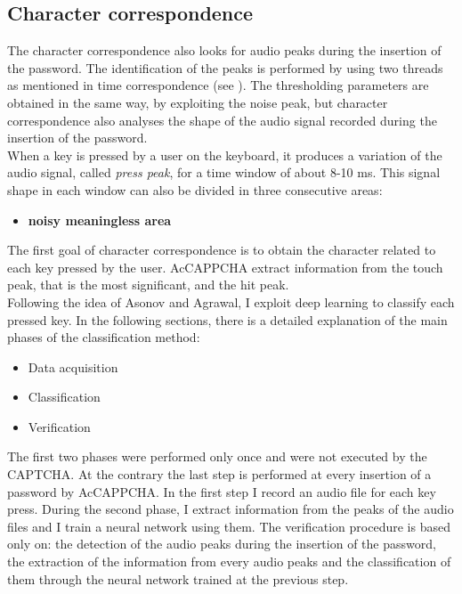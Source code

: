 \subsection{Character correspondence}\label{AcCAPPCHA:char_correspondence}
The character correspondence also looks for audio peaks during the insertion of the password. The identification of the peaks is performed by using two threads as mentioned in time correspondence (see ). The thresholding parameters are obtained in the same way, by exploiting the noise peak, but character correspondence also analyses the shape of the audio signal recorded during the insertion of the password.\\
When a key is pressed by a user on the keyboard, it produces a variation of the audio signal, called \textit{press peak}, for a time window of about 8-10 ms\cite{keyboard_acoustic}. This signal shape in each window can also be divided in three consecutive areas:
\begin{itemize}
\item{\textbf{noisy meaningless area}}
\end{itemize}
The first goal of character correspondence is to obtain the character related to each key pressed by the user. AcCAPPCHA extract information from the touch peak, that is the most significant, and the hit peak.\\
Following the idea of Asonov and Agrawal, I exploit deep learning to classify each pressed key. In the following sections, there is a detailed explanation of the main phases of the classification method:
\begin{itemize}
\item{Data acquisition}
\item{Classification}
\item{Verification}
\end{itemize}
The first two phases were performed only once and were not executed by the CAPTCHA. At the contrary the last step is performed at every insertion of a password by AcCAPPCHA.
In the first step I record an audio file for each key press. During the second phase, I extract information from the peaks of the audio files and I train a neural network using them. The verification procedure is based only on: the detection of the audio peaks during the insertion of the password, the extraction of the information from every audio peaks and the classification of them through the neural network trained at the previous step.

